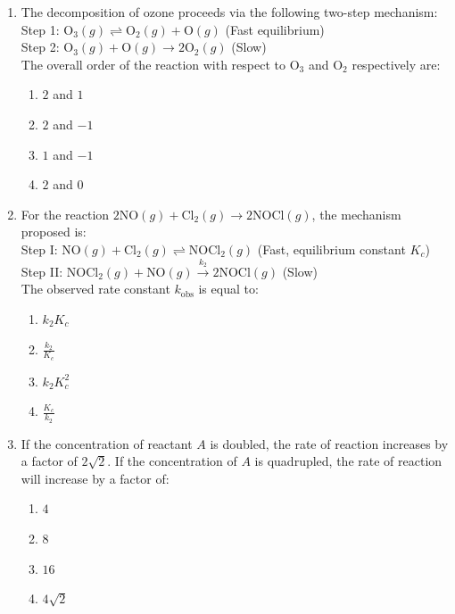 \documentclass[11pt, a4paper]{article}
\begin{document}
\begin{enumerate}
\item The decomposition of ozone proceeds via the following two-step mechanism: \\
Step 1: $\text{O}_3(g) \rightleftharpoons \text{O}_2(g) + \text{O}(g)$ \quad (Fast equilibrium) \\
Step 2: $\text{O}_3(g) + \text{O}(g) \rightarrow 2\text{O}_2(g)$ \quad (Slow) \\
The overall order of the reaction with respect to $\text{O}_3$ and $\text{O}_2$ respectively are:
\begin{enumerate}
    \item $2$ and $1$
    \item $2$ and $-1$
    \item $1$ and $-1$
    \item $2$ and $0$
\end{enumerate}

\item For the reaction $2\text{NO}(g) + \text{Cl}_2(g) \rightarrow 2\text{NOCl}(g)$, the mechanism proposed is: \\
Step I: $\text{NO}(g) + \text{Cl}_2(g) \rightleftharpoons \text{NOCl}_2(g)$ \quad (Fast, equilibrium constant $K_c$) \\
Step II: $\text{NOCl}_2(g) + \text{NO}(g) \xrightarrow{k_2} 2\text{NOCl}(g)$ \quad (Slow) \\
The observed rate constant $k_{\text{obs}}$ is equal to:
\begin{enumerate}
    \item $k_2 K_c$
    \item $\frac{k_2}{K_c}$
    \item $k_2 K_c^2$
    \item $\frac{K_c}{k_2}$
\end{enumerate}

\item If the concentration of reactant $A$ is doubled, the rate of reaction increases by a factor of $2\sqrt{2}$. If the concentration of $A$ is quadrupled, the rate of reaction will increase by a factor of:
\begin{enumerate}
    \item $4$
    \item $8$
    \item $16$
    \item $4\sqrt{2}$
\end{enumerate}


\end{enumerate}
\end{document}
